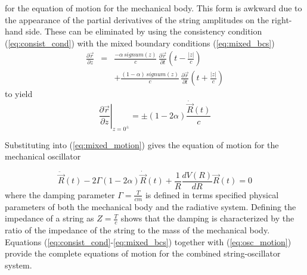 \noindent for the equation of motion for the mechanical body.  
This form is awkward due to the appearance of the partial 
derivatives of the string amplitudes on the right-hand side.
These can be eliminated by using the consistency condition
(\ref{eq:consist_cond}) with the mixed boundary conditions
(\ref{eq:mixed_bcs}) 
\begin{eqnarray*}
	\frac{\partial {\vec r}}{\partial z} & = &   \frac{-\alpha \, signum(z)}{c} \, 
	                                       \frac{\partial {\vec r}}{\partial t}
										   \left(t - \frac{|z|}{c} \right) \\
										 &   & +
										   \frac{(1-\alpha) \, signum(z)}{c} \,
	                                       \frac{\partial {\vec r}}{\partial t}
										   \left(t + \frac{|z|}{c} \right)
\end{eqnarray*}
to yield
\[
	\left. \frac{\partial {\vec r}}{\partial z} \right|_{z=0^{\pm}} 
	= \pm \left( 1 - 2 \alpha \right)\frac{{\dot {\vec R}}(t)}{c} 
\]

Substituting into (\ref{eq:mixed_motion}) gives the equation of 
motion for the mechanical oscillator 

\begin{equation}\label{eq:osc_motion}
    {\ddot {\vec R}}(t) - 2 \Gamma \left(1 - 2 \alpha \right) {\dot {\vec R}}(t)  
   +\frac{1}{R} \frac{d V(R)}{d R} {\vec R}(t) = 0
\end{equation}
where the damping parameter $\Gamma = \frac{T}{cm}$ is defined in 
terms specified physical parameters of both the mechanical body 
and the radiative system.  Defining the impedance of a string
as $Z = \frac{T}{c}$ \cite{pain} shows that the damping is
characterized by the ratio of the impedance of the string to 
the mass of the mechanical body.
Equations (\ref{eq:consist_cond}-\ref{eq:mixed_bcs}) together with 
(\ref{eq:osc_motion}) provide the complete equations of motion for 
the combined string-oscillator system.  

